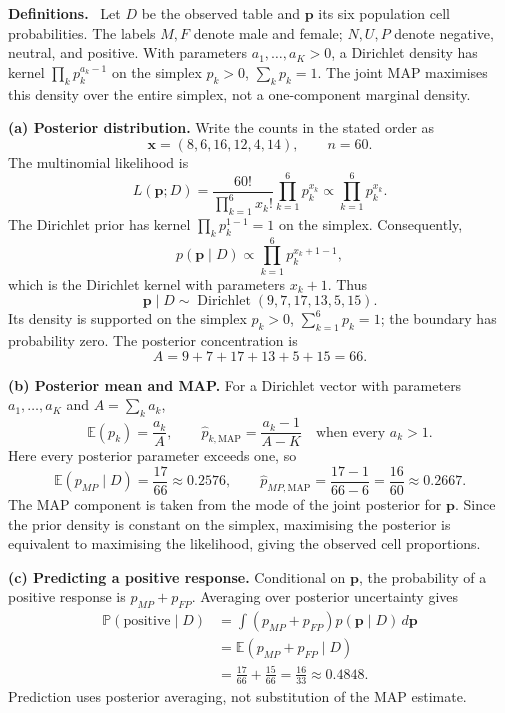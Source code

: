 \documentclass[11pt,a4paper]{article}
\newcommand{\E}{\mathbb{E}}
\newcommand{\studyheading}[1]{%
  \par\medskip\noindent\textcolor{statblue}{\textbf{#1.}}\ }
\begin{document}
\studyheading{Definitions}
Let $D$ be the observed table and $\mathbf p$ its six population cell probabilities.
The labels $M,F$ denote male and female; $N,U,P$ denote negative, neutral, and positive.
With parameters $a_1,\ldots,a_K>0$, a Dirichlet density has kernel
$\prod_k p_k^{a_k-1}$ on the simplex $p_k>0$, $\sum_kp_k=1$.
The joint MAP maximises this density over the entire simplex, not a one-component marginal density.

\textbf{(a) Posterior distribution.}
Write the counts in the stated order as
\[
\mathbf x=(8,6,16,12,4,14),\qquad n=60.
\]
The multinomial likelihood is
\[
L(\mathbf p;D)=\frac{60!}{\prod_{k=1}^{6}x_k!}
\prod_{k=1}^{6}p_k^{x_k}
\propto\prod_{k=1}^{6}p_k^{x_k}.
\]
The Dirichlet prior has kernel $\prod_k p_k^{1-1}=1$ on the simplex.
Consequently,
\[
p(\mathbf p\mid D)\propto
\prod_{k=1}^{6}p_k^{x_k+1-1},
\]
which is the Dirichlet kernel with parameters $x_k+1$. Thus
\[
\boxed{\mathbf p\mid D\sim\operatorname{Dirichlet}(9,7,17,13,5,15).}
\]
Its density is supported on the simplex $p_k>0$, $\sum_{k=1}^6p_k=1$;
the boundary has probability zero. The posterior concentration is
\[
A=9+7+17+13+5+15=66.
\]

\textbf{(b) Posterior mean and MAP.}
For a Dirichlet vector with parameters $a_1,\ldots,a_K$ and
$A=\sum_k a_k$,
\[
\E(p_k)=\frac{a_k}{A},\qquad
\widehat p_{k,\mathrm{MAP}}=\frac{a_k-1}{A-K}
\quad\text{when every }a_k>1.
\]
Here every posterior parameter exceeds one, so
\[
\boxed{\E(p_{MP}\mid D)=\frac{17}{66}\approx0.2576,}
\qquad
\boxed{\widehat p_{MP,\mathrm{MAP}}=
\frac{17-1}{66-6}=\frac{16}{60}\approx0.2667.}
\]
The MAP component is taken from the mode of the joint posterior for
$\mathbf p$. Since the prior density is constant on the simplex, maximising
the posterior is equivalent to maximising the likelihood, giving the observed
cell proportions.

\textbf{(c) Predicting a positive response.}
Conditional on $\mathbf p$, the probability of a positive response is
$p_{MP}+p_{FP}$. Averaging over posterior uncertainty gives
\[
\begin{aligned}
\mathbb{P}(\text{positive}\mid D)
&=\int (p_{MP}+p_{FP})p(\mathbf p\mid D)\,d\mathbf p\\
&=\E(p_{MP}+p_{FP}\mid D)\\
&=\frac{17}{66}+\frac{15}{66}
=\boxed{\frac{16}{33}\approx0.4848.}
\end{aligned}
\]
Prediction uses posterior averaging, not substitution of the MAP estimate.
\end{document}
